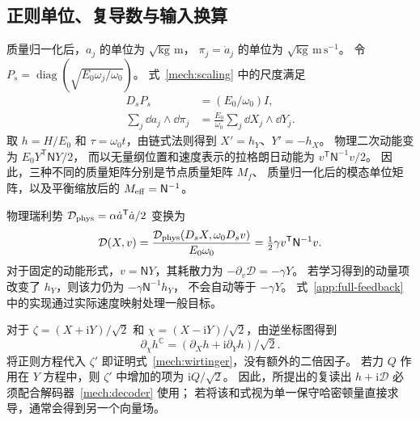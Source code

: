 \subsection{正则单位、复导数与输入换算}
\label{sm:scaling}
质量归一化后，$a_j$ 的单位为 $\sqrt{\mathrm{kg}}\,\mathrm m$，
$\pi_j=\dot a_j$ 的单位为 $\sqrt{\mathrm{kg}}\,\mathrm{m\,s^{-1}}$。
令 $P_s=\operatorname{diag}(\sqrt{E_0\omega_j/\omega_0})$。
式~\eqref{mech:scaling} 中的尺度满足
\begin{align}
 D_sP_s&=(E_0/\omega_0)I,\nonumber\\
 \sum_j\dd a_j\wedge\dd\pi_j
 &=\frac{E_0}{\omega_0}\sum_j\dd X_j\wedge\dd Y_j.
 \label{sm:scaled-form}
\end{align}
取 $h=H/E_0$ 和 $\tau=\omega_0t$，由链式法则得到 $X'=h_Y$、$Y'=-h_X$。
物理二次动能变为 $E_0Y^{\mathsf T}\mathsf NY/2$，
而以无量纲位置和速度表示的拉格朗日动能为 $v^{\mathsf T}\mathsf N^{-1}v/2$。
因此，三种不同的质量矩阵分别是节点质量矩阵 $M_f$、
质量归一化后的模态单位矩阵，以及平衡缩放后的 $M_{\rm eff}=\mathsf N^{-1}$。

物理瑞利势 $\mathcal D_{\rm phys}=\alpha\dot a^{\mathsf T}\dot a/2$ 变换为
\begin{equation}
 \mathcal D(X,v)=
 \frac{\mathcal D_{\rm phys}(D_sX,\omega_0D_sv)}{E_0\omega_0}
 =\tfrac12\gamma v^{\mathsf T}\mathsf N^{-1}v.
 \label{sm:rayleigh-scale}
\end{equation}
对于固定的动能形式，$v=\mathsf NY$，其耗散力为 $-\partial_v\mathcal D=-\gamma Y$。
若学习得到的动量项改变了 $h_Y$，则该力仍为 $-\gamma\mathsf N^{-1}h_Y$，
不会自动等于 $-\gamma Y$。
式~\eqref{app:full-feedback} 中的实现通过实际速度映射处理一般目标。

对于 $\zeta=(X+\mathrm iY)/\sqrt2$ 和 $\chi=(X-\mathrm iY)/\sqrt2$，由逆坐标图得到
\begin{equation}
 \partial_\chi h^{\mathbb C}
     =(\partial_Xh+\mathrm i\partial_Yh)/\sqrt2.
 \label{sm:complex-chain-rule}
\end{equation}
将正则方程代入 $\zeta'$ 即证明式~\eqref{mech:wirtinger}，没有额外的二倍因子。
若力 $Q$ 作用在 $Y$ 方程中，则 $\zeta'$ 中增加的项为 $\mathrm iQ/\sqrt2$。
因此，所提出的复读出 $h+\mathrm i\mathcal D$ 必须配合解码器~\eqref{mech:decoder} 使用；
若将该和式视为单一保守哈密顿量直接求导，通常会得到另一个向量场。

